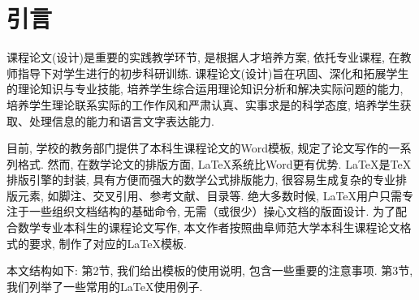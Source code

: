 \section{引言}

课程论文(设计)是重要的实践教学环节, 是根据人才培养方案, 依托专业课程, 在教师指导下对学生进行的初步科研训练. 课程论文(设计)旨在巩固、深化和拓展学生的理论知识与专业技能, 培养学生综合运用理论知识分析和解决实际问题的能力, 培养学生理论联系实际的工作作风和严肃认真、实事求是的科学态度, 培养学生获取、处理信息的能力和语言文字表达能力.

目前, 学校的教务部门提供了本科生课程论文的Word模板, 规定了论文写作的一系列格式. 然而, 在数学论文的排版方面, \LaTeX 系统比Word更有优势. \LaTeX 是\TeX 排版引擎的封装, 具有方便而强大的数学公式排版能力, 很容易生成复杂的专业排版元素, 如脚注、交叉引用、参考文献、目录等. 绝大多数时候, \LaTeX 用户只需专注于一些组织文档结构的基础命令, 无需（或很少）操心文档的版面设计. 为了配合数学专业本科生的课程论文写作, 本文作者按照曲阜师范大学本科生课程论文格式的要求, 制作了对应的\LaTeX 模板.

本文结构如下: 第2节, 我们给出模板的使用说明, 包含一些重要的注意事项. 第3节, 我们列举了一些常用的\LaTeX 使用例子.
